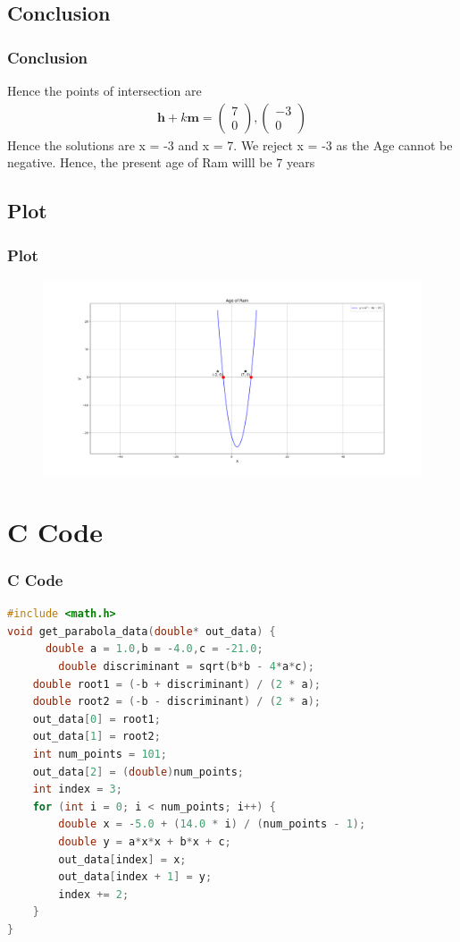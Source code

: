 \documentclass{beamer}
\theoremstyle{remark}
\newcommand{\myvec}[1]{\ensuremath{\begin{pmatrix}#1\end{pmatrix}}}
\let\vec\mathbf
\numberwithin{equation}{section}
\begin{document}
\subsection{Conclusion}
\begin{frame}
\frametitle{Conclusion}
Hence the points of intersection are
\begin{align}
\vec{h}+k\vec{m}=\myvec{7\\0},\myvec{-3\\0}
\end{align}
Hence the solutions are x = -3 and x = 7. We reject
x = -3 as the Age cannot be negative. Hence, the present age of Ram willl be 7 years
\end{frame}
\subsection{Plot}
\begin{frame}[fragile]
\frametitle{Plot}

\begin{figure}[h!]
   \centering
   \includegraphics[width=0.7\columnwidth]{figs/fig1.png}
	\caption{}
   \label{}
\end{figure}
\end{frame}

\section{C Code}
\begin{frame}[fragile]
\frametitle{C Code}
\begin{lstlisting}[language=C]
#include <math.h>
void get_parabola_data(double* out_data) {
      double a = 1.0,b = -4.0,c = -21.0;
        double discriminant = sqrt(b*b - 4*a*c);
    double root1 = (-b + discriminant) / (2 * a);
    double root2 = (-b - discriminant) / (2 * a);
    out_data[0] = root1;
    out_data[1] = root2;
    int num_points = 101;
    out_data[2] = (double)num_points;
    int index = 3;
    for (int i = 0; i < num_points; i++) {
        double x = -5.0 + (14.0 * i) / (num_points - 1);
        double y = a*x*x + b*x + c;
        out_data[index] = x;
        out_data[index + 1] = y;
        index += 2;
    }
}

    \end{lstlisting}
\end{frame}
\end{document}
